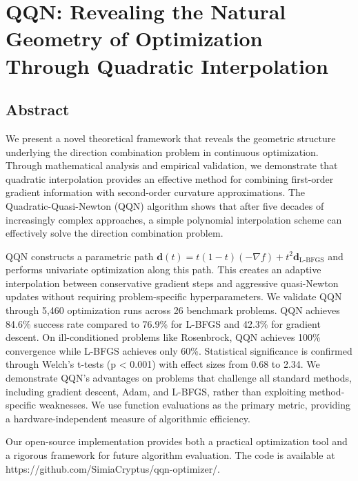 \hypertarget{qqn-revealing-the-natural-geometry-of-optimization-through-quadratic-interpolation}{%
\section{QQN: Revealing the Natural Geometry of Optimization Through Quadratic Interpolation}\label{qqn-revealing-the-natural-geometry-of-optimization-through-quadratic-interpolation}}

\hypertarget{abstract}{%
\subsection{Abstract}\label{abstract}}

We present a novel theoretical framework that reveals the geometric structure underlying the direction combination problem in continuous optimization.
Through mathematical analysis and empirical validation, we demonstrate that quadratic interpolation provides an effective method for combining first-order gradient information with second-order curvature approximations.
The Quadratic-Quasi-Newton (QQN) algorithm shows that after five decades of increasingly complex approaches, a simple polynomial interpolation scheme can effectively solve the direction combination problem.

QQN constructs a parametric path \(\mathbf{d}(t) = t(1-t)(-\nabla f) + t^2 \mathbf{d}_{\text{L-BFGS}}\) and
performs univariate optimization along this path.
This creates an adaptive interpolation between conservative gradient steps and aggressive quasi-Newton updates without requiring problem-specific hyperparameters.
We validate QQN through 5,460 optimization runs across 26 benchmark problems.
QQN achieves 84.6\% success rate compared to 76.9\% for L-BFGS and 42.3\% for gradient descent.
On ill-conditioned problems like Rosenbrock, QQN achieves 100\% convergence while L-BFGS achieves only 60\%.
Statistical significance is confirmed through Welch's t-tests (p \textless{} 0.001) with effect sizes from 0.68 to 2.34.
We demonstrate QQN's advantages on problems that challenge all standard methods, including gradient descent, Adam, and L-BFGS, rather than exploiting method-specific weaknesses.
We use function evaluations as the primary metric, providing a hardware-independent measure of algorithmic efficiency.

Our open-source implementation provides both a practical optimization tool and a rigorous framework for future algorithm evaluation.
The code is available at https://github.com/SimiaCryptus/qqn-optimizer/.

